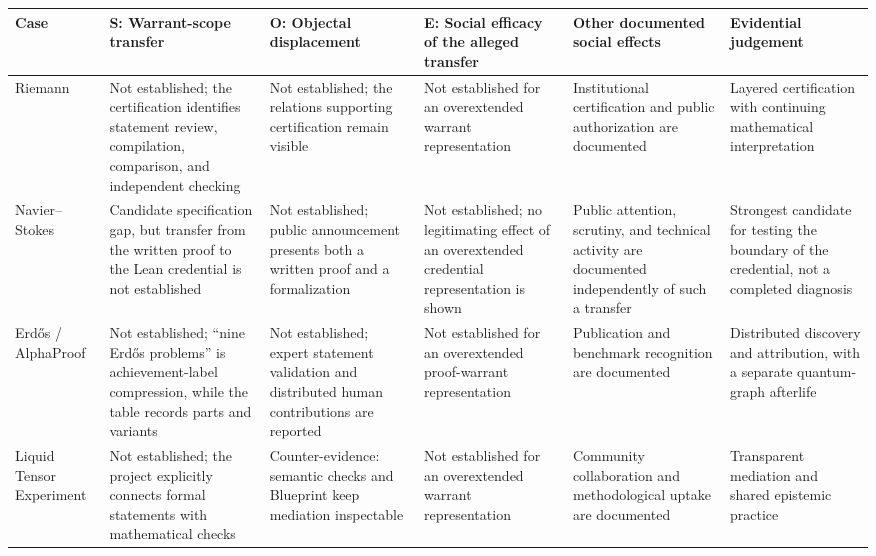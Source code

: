 \documentclass[sn-apa]{sn-jnl}
\begin{document}
\begin{longtable}{p{}p{}p{}p{}p{}p{}}
\toprule

Case & S: Warrant-scope transfer & O: Objectal displacement & E: Social efficacy of the alleged transfer & Other documented social effects & Evidential judgement \\

\midrule

Riemann & Not established; the certification identifies statement review, compilation, comparison, and independent checking & Not established; the relations supporting certification remain visible & Not established for an overextended warrant representation & Institutional certification and public authorization are documented & Layered certification with continuing mathematical interpretation \\

Navier–Stokes & Candidate specification gap, but transfer from the written proof to the Lean credential is not established & Not established; public announcement presents both a written proof and a formalization & Not established; no legitimating effect of an overextended credential representation is shown & Public attention, scrutiny, and technical activity are documented independently of such a transfer & Strongest candidate for testing the boundary of the credential, not a completed diagnosis \\

Erdős / AlphaProof & Not established; “nine Erdős problems” is achievement-label compression, while the table records parts and variants & Not established; expert statement validation and distributed human contributions are reported & Not established for an overextended proof-warrant representation & Publication and benchmark recognition are documented & Distributed discovery and attribution, with a separate quantum-graph afterlife \\

Liquid Tensor Experiment & Not established; the project explicitly connects formal statements with mathematical checks & Counter-evidence: semantic checks and Blueprint keep mediation inspectable & Not established for an overextended warrant representation & Community collaboration and methodological uptake are documented & Transparent mediation and shared epistemic practice \\

\bottomrule
\end{longtable}
\end{document}
